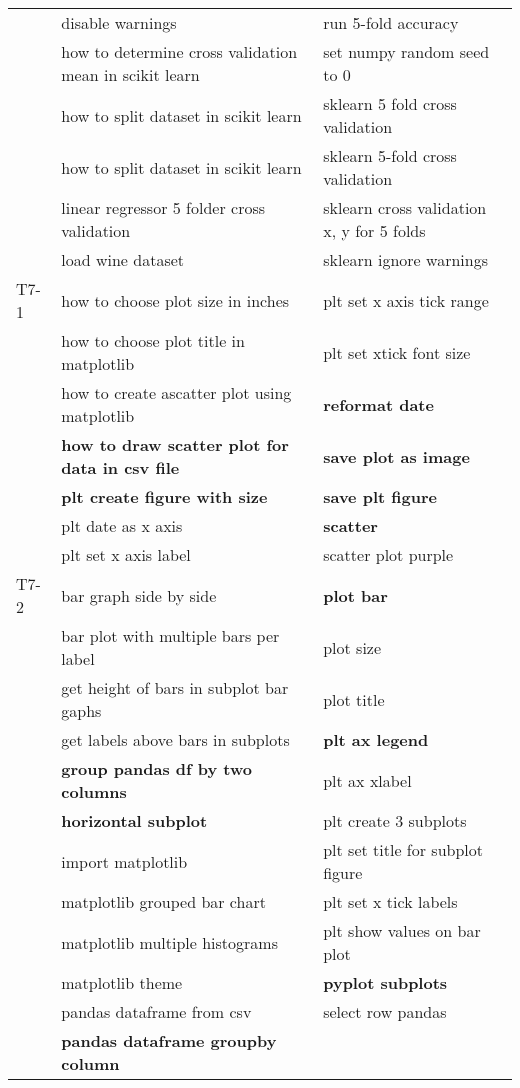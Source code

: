 \begin{longtable}{lLL}
& disable warnings & run 5-fold accuracy \\
& how to determine cross validation mean in scikit learn & set numpy random seed to 0 \\
& how to split dataset  in scikit learn & sklearn 5 fold cross validation \\
& how to split dataset in scikit learn & sklearn 5-fold cross validation \\
& linear regressor 5 folder cross validation & sklearn cross validation x, y for 5 folds \\
& load wine dataset & sklearn ignore warnings \\
T7-1 & how to choose plot size in inches & plt set x axis tick range \\
& how to choose plot title in matplotlib & plt set xtick font size \\
& how to create ascatter plot using matplotlib & \textbf{reformat date} \\
& \textbf{how to draw scatter plot for data in csv file} & \textbf{save plot as image} \\
& \textbf{plt create figure with size} & \textbf{save plt figure} \\
& plt date as x axis & \textbf{scatter} \\
& plt set x axis label & scatter plot purple \\
T7-2 & bar graph side by side & \textbf{plot bar} \\
& bar plot with multiple bars per label & plot size \\
& get height of bars in subplot bar gaphs & plot title \\
& get labels above bars in subplots & \textbf{plt ax legend} \\
& \textbf{group pandas df by two columns} & plt ax xlabel \\
& \textbf{horizontal subplot} & plt create 3 subplots \\
& import matplotlib & plt set title for subplot figure \\
& matplotlib grouped bar chart & plt set x tick labels \\
& matplotlib multiple histograms & plt show values on bar plot \\
& matplotlib theme & \textbf{pyplot subplots} \\
& pandas dataframe from csv & select row pandas \\
& \textbf{pandas dataframe groupby column} \\

\bottomrule
\end{longtable}
